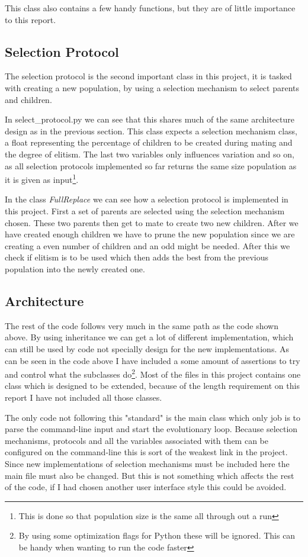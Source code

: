 This class also contains a few handy functions, but they are of little
importance to this report.

\subsection{Selection Protocol}\label{sec:selection protocol}
The selection protocol is the second important class in this project, it is
tasked with creating a new population, by using a selection mechanism to select
parents and children.

In select\_protocol.py we can see that this shares much of the
same architecture design as in the previous section. This class expects a
selection mechanism class, a float representing the percentage of children 
to be created during mating and the degree of elitism.
The last two variables only influences variation and so on, as all selection
protocols implemented so far returns the same size population as it is given as
input\footnote{This is done so that population size is the same all through out
a run}.

In the class \textit{FullReplace} we can see how a selection
protocol is implemented in this project. First a set of parents are selected
using the selection mechanism chosen. These two parents then get to mate to
create two new children. After we have created enough children we have to prune
the new population since we are creating a even number of children and an odd
might be needed. After this we check if elitism is to be used which then adds
the best from the previous population into the newly created one.

\subsection{Architecture}\label{sec:architecture}
The rest of the code follows very much in the same path as the code shown above.
By using inheritance we can get a lot of different implementation, which can
still be used by code not specially design for the new implementations. As can
be seen in the code above I have included a some amount of assertions to try and
control what the subclasses do\footnote{By using some optimization flags for
	Python these will be ignored. This can be handy when wanting to run the
code faster}. Most of the files in this project contains one class which is
designed to be extended, because of the length requirement on this report
I have not included all those classes.

The only code not following this "standard" is the main class which only job is
to parse the command-line input and start the evolutionary loop. Because
selection mechanisms, protocols and all the variables associated with them can
be configured on the command-line this is sort of the weakest link in the
project. Since new implementations of selection mechanisms must be included here
the main file must also be changed. But this is not something which affects the
rest of the code, if I had chosen another user interface style this could be
avoided.

